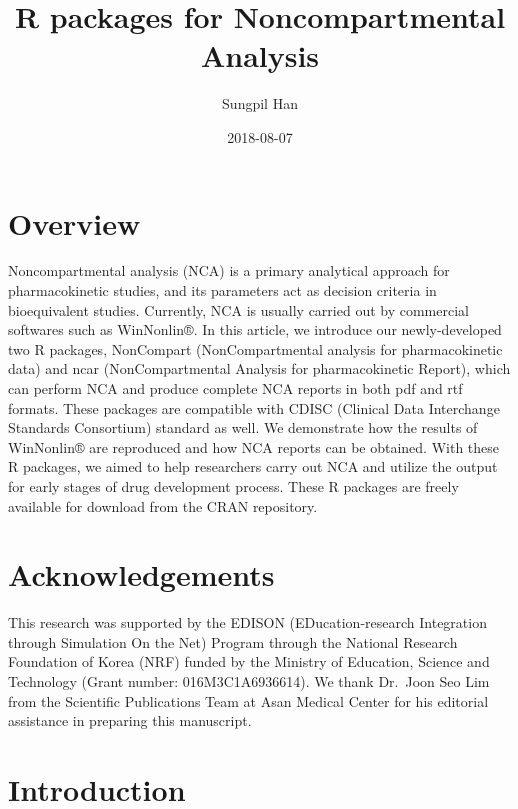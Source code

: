 \documentclass[12pt,]{krantz}
\title{R packages for Noncompartmental Analysis}
\author{Sungpil Han}
\date{2018-08-07}
\theoremstyle{definition}
\theoremstyle{definition}
\theoremstyle{definition}
\theoremstyle{remark}
\begin{document}
\maketitle

{
\hypersetup{linkcolor=}
\setcounter{tocdepth}{2}
\tableofcontents
}
\listoftables
\listoffigures
\hypertarget{overview}{%
\chapter*{Overview}\label{overview}}


Noncompartmental analysis (NCA) is a primary analytical approach for
pharmacokinetic studies, and its parameters act as decision criteria in
bioequivalent studies. Currently, NCA is usually carried out by
commercial softwares such as WinNonlin®. In this article, we introduce
our newly-developed two R packages, NonCompart (NonCompartmental
analysis for pharmacokinetic data) and ncar (NonCompartmental Analysis
for pharmacokinetic Report), which can perform NCA and produce complete
NCA reports in both pdf and rtf formats. These packages are compatible
with CDISC (Clinical Data Interchange Standards Consortium) standard as
well. We demonstrate how the results of WinNonlin® are reproduced and
how NCA reports can be obtained. With these R packages, we aimed to help
researchers carry out NCA and utilize the output for early stages of
drug development process. These R packages are freely available for
download from the CRAN repository.

\hypertarget{acknowledgements}{%
\chapter*{Acknowledgements}\label{acknowledgements}}


This research was supported by the EDISON (EDucation-research
Integration through Simulation On the Net) Program through the National
Research Foundation of Korea (NRF) funded by the Ministry of Education,
Science and Technology (Grant number: 016M3C1A6936614). We thank
Dr.~Joon Seo Lim from the Scientific Publications Team at Asan Medical
Center for his editorial assistance in preparing this manuscript.

\mainmatter

\hypertarget{introduction}{%
\chapter{Introduction}\label{introduction}}
\end{document}
